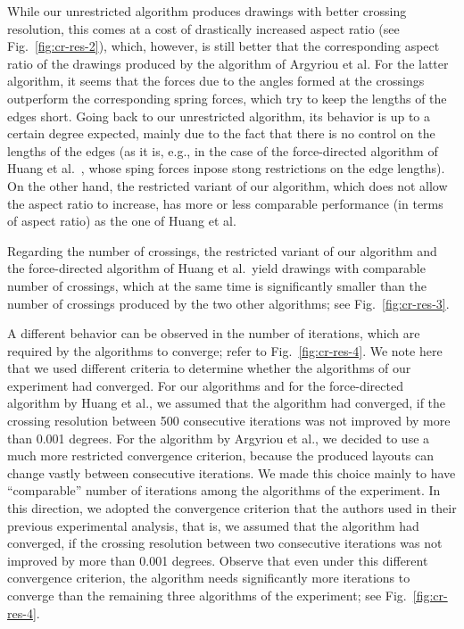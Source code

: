 \documentclass{comjnl}
\begin{document}
While our unrestricted algorithm produces drawings with better crossing resolution, this comes at a cost of drastically increased aspect ratio (see Fig.~\ref{fig:cr-res-2}), which, however, is still better that the corresponding aspect ratio of the drawings produced by the algorithm of Argyriou et al. For the latter algorithm, it seems that the forces due to the angles formed at the crossings outperform the corresponding spring forces, which try to keep the lengths of the edges short. Going back to our unrestricted algorithm, its behavior is up to a certain degree expected, mainly due to the fact that there is no control on the lengths of the edges (as it is, e.g., in the case of the force-directed algorithm of Huang et al.~\cite{DBLP:journals/vlc/HuangEHL13}, whose sping forces inpose stong restrictions on the edge lengths). On the other hand, the restricted variant of our algorithm, which does not allow the aspect ratio to increase, has more or less comparable performance (in terms of aspect ratio) as the one of Huang et al.

Regarding the number of crossings, the restricted variant of our algorithm and the force-directed algorithm of Huang et al.\ yield drawings with comparable number of crossings, which at the same time is significantly smaller than the  number of crossings produced by the two other algorithms; see Fig.~\ref{fig:cr-res-3}.

A different behavior can be observed in the number of iterations, which are required by the algorithms to converge; refer to Fig.~\ref{fig:cr-res-4}. We note here that we used different criteria to determine whether the algorithms of our experiment had converged. For our algorithms and for the force-directed algorithm by Huang et al., we assumed that the algorithm had converged, if the crossing resolution between 500 consecutive iterations was not improved by more than 0.001 degrees. For the algorithm by Argyriou et al., we decided to use a much more restricted convergence criterion, because the produced layouts can change vastly between  consecutive iterations. We made this choice mainly to have ``comparable'' number of iterations among the algorithms of the experiment. In this direction, we adopted the convergence criterion that the authors used in their previous experimental analysis, that is, we assumed that the algorithm had converged, if the crossing resolution between two consecutive iterations was not improved by more than 0.001 degrees. Observe that even under this different convergence criterion, the algorithm needs significantly more iterations to converge than the remaining three algorithms of the experiment; see Fig.~\ref{fig:cr-res-4}. 
\end{document}
